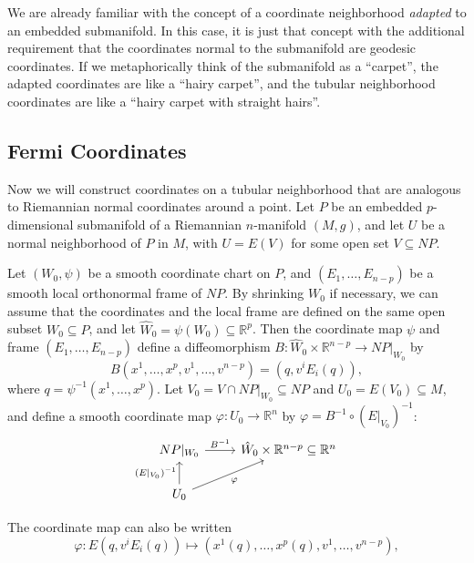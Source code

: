\documentclass[../main.tex]{subfiles}
\begin{document}
\begin{remark}
	We are already familiar with the concept of a coordinate neighborhood \emph{adapted} to an embedded submanifold. In this case, it is just that concept with the additional requirement that the coordinates normal to the submanifold are geodesic coordinates. If we metaphorically think of the submanifold as a ``carpet'', the adapted coordinates are like a ``hairy carpet'', and the tubular neighborhood coordinates are like a ``hairy carpet with straight hairs''.
\end{remark}

\subsection{Fermi Coordinates}
Now we will construct coordinates on a tubular neighborhood that are analogous to Riemannian normal coordinates around a point. Let $P$ be an embedded $p$-dimensional submanifold of a Riemannian $n$-manifold $(M, g)$, and let $U$ be a normal neighborhood of $P$ in $M$, with $U = E(V)$ for some open set $V \subseteq NP$.

Let $(W_0, \psi)$ be a smooth coordinate chart on $P$, and $(E_1, \ldots , E_{n-p})$ be a smooth local orthonormal frame of $NP$. By shrinking $W_0$ if necessary, we can assume that the coordinates and the local frame are defined on the same open subset $W_0 \subseteq P$, and let $\hat{W}_0 = \psi(W_0) \subseteq \mathbb{R}^p$. Then the coordinate map $\psi$ and frame $(E_1, \ldots , E_{n-p})$ define a diffeomorphism $B: \hat{W}_0 \times \mathbb{R}^{n-p} \to NP|_{W_0}$ by
\begin{equation}
	B(x^1, \ldots, x^p, v^1, \ldots, v^{n-p}) = (q, v^i E_i(q)),
\end{equation}
where $q = \psi^{-1}(x^1, \ldots, x^p)$. Let $V_0 = V \cap NP|_{W_0} \subseteq NP$ and $U_0 = E(V_0) \subseteq M$, and define a smooth coordinate map $\varphi: U_0 \to \mathbb{R}^n$ by $\varphi = B^{-1} \circ (E|_{V_0})^{-1}$:
\begin{equation}
	\begin{tikzcd}
		NP|_{W_0} \arrow[r, "B^{-1}"] & \hat{W}_0 \times \mathbb{R}^{n-p} \subseteq \mathbb{R}^n \\
		U_0 \arrow[u, "(E|_{V_0})^{-1}"] \arrow[ru, "\varphi"']
	\end{tikzcd}
\end{equation}

The coordinate map can also be written
\begin{equation}
	\varphi: E(q, v^i E_i(q)) \mapsto (x^1(q), \ldots, x^p(q), v^1, \ldots, v^{n-p}),
\end{equation}
\end{document}
